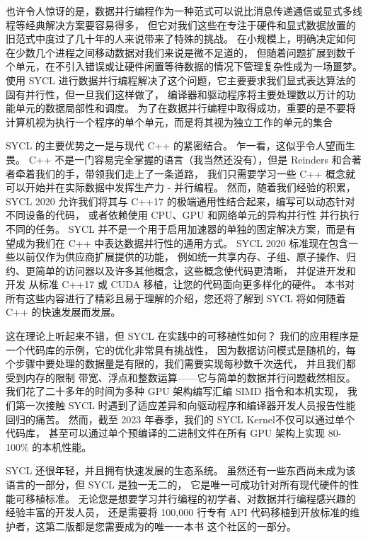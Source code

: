 也许令人惊讶的是，数据并行编程作为一种范式可以说比消息传递通信或显式多线程等经典解决方案要容易得多，
但它对我们这些在专注于硬件和显式数据放置的旧范式中度过了几十年的人来说带来了特殊的挑战。
在小规模上，明确决定如何在少数几个进程之间移动数据对我们来说是微不足道的，
但随着问题扩展到数千个单元，在不引入错误或让硬件闲置等待数据的情况下管理复杂性成为一场噩梦。
使用 SYCL 进行数据并行编程解决了这个问题，它主要要求我们显式表达算法的固有并行性，但一旦我们这样做了，
编译器和驱动程序将主要处理数以万计的功能单元的数据局部性和调度。
为了在数据并行编程中取得成功，重要的是不要将计算机视为执行一个程序的单个单元，而是将其视为独立工作的单元的集合

SYCL 的主要优势之一是与现代 C++ 的紧密结合。 乍一看，这似乎令人望而生畏。 
C++ 不是一门容易完全掌握的语言（我当然还没有），但是 Reinders 和合著者牵着我们的手，带领我们走上了一条道路，
我们只需要学习一些 C++ 概念就可以开始并在实际数据中发挥生产力 - 并行编程。 
然而，随着我们经验的积累，SYCL 2020 允许我们将其与 C++17 的极端通用性结合起来，编写可以动态针对不同设备的代码，
或者依赖使用 CPU、GPU 和网络单元的异构并行性 并行执行不同的任务。 
SYCL 并不是一个用于启用加速器的单独的固定解决方案，而是有望成为我们在 C++ 中表达数据并行性的通用方式。 
SYCL 2020 标准现在包含一些以前仅作为供应商扩展提供的功能，
例如统一共享内存、子组、原子操作、归约、更简单的访问器以及许多其他概念，这些概念使代码更清晰，
并促进开发和开发 从标准 C++17 或 CUDA 移植，让您的代码面向更多样化的硬件。 
本书对所有这些内容进行了精彩且易于理解的介绍，您还将了解到 SYCL 将如何随着 C++ 的快速发展而发展。

这在理论上听起来不错，但 SYCL 在实践中的可移植性如何？ 我们的应用程序是一个代码库的示例，它的优化非常具有挑战性，
因为数据访问模式是随机的，每个步骤中要处理的数据量是有限的，我们需要实现每秒数千次迭代，
并且我们都受到内存的限制 带宽、浮点和整数运算——它与简单的数据并行问题截然相反。 
我们花了二十多年的时间为多种 GPU 架构编写汇编 SIMD 指令和本机实现，
我们第一次接触 SYCL 时遇到了适应差异和向驱动程序和编译器开发人员报告性能回归的痛苦。 
然而，截至 2023 年春季，我们的 SYCL Kernel不仅可以通过单个代码库，
甚至可以通过单个预编译的二进制文件在所有 GPU 架构上实现 80-100\% 的本机性能。

SYCL 还很年轻，并且拥有快速发展的生态系统。 虽然还有一些东西尚未成为该语言的一部分，但 SYCL 是独一无二的，
它是唯一可成功针对所有现代硬件的性能可移植标准。 
无论您是想要学习并行编程的初学者、对数据并行编程感兴趣的经验丰富的开发人员，
还是需要将 100,000 行专有 API 代码移植到开放标准的维护者，这第二版都是您需要成为的唯一一本书 这个社区的一部分。